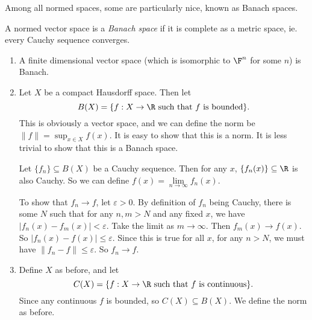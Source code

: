 \documentclass[a4paper]{article}
\begin{document}
Among all normed spaces, some are particularly nice, known as Banach spaces.
\begin{defi}
  A normed vector space is a \emph{Banach space} if it is complete as a metric space, ie. every Cauchy sequence converges.
\end{defi}

\begin{eg}\leavevmode
  \begin{enumerate}
    \item A finite dimensional vector space (which is isomorphic to $\F^n$ for some $n$) is Banach.
    \item Let $X$ be a compact Hausdorff space. Then let
      \[
        B(X) = \{f: X\to \R\text{ such that }f\text{ is bounded}\}.
      \]
      This is obviously a vector space, and we can define the norm be $\|f\| = \sup_{x\in X}f(x)$. It is easy to show that this is a norm. It is less trivial to show that this is a Banach space.

      Let $\{f_n\}\subseteq B(X)$ be a Cauchy sequence. Then for any $x$, $\{f_n(x)\}\subseteq \R$ is also Cauchy. So we can define $f(x) = \lim\limits_{n \to \infty}f_n(x)$.

      To show that $f_n \to f$, let $\varepsilon > 0$. By definition of $f_n$ being Cauchy, there is some $N$ such that for any $n, m > N$ and any fixed $x$, we have $|f_n(x) - f_m(x)| < \varepsilon$. Take the limit as $m \to \infty$. Then $f_m(x) \to f(x)$. So $|f_n(x) - f(x)| \leq \varepsilon$. Since this is true for all $x$, for any $n > N$, we must have $\|f_n - f\| \leq \varepsilon$. So $f_n \to f$.

    \item Define $X$ as before, and let
      \[
        C(X) = \{f: X\to \R\text{ such that }f\text{ is continuous}\}.
      \]
      Since any continuous $f$ is bounded, so $C(X) \subseteq B(X)$. We define the norm as before.


\end{enumerate}
\end{eg}
\end{document}
